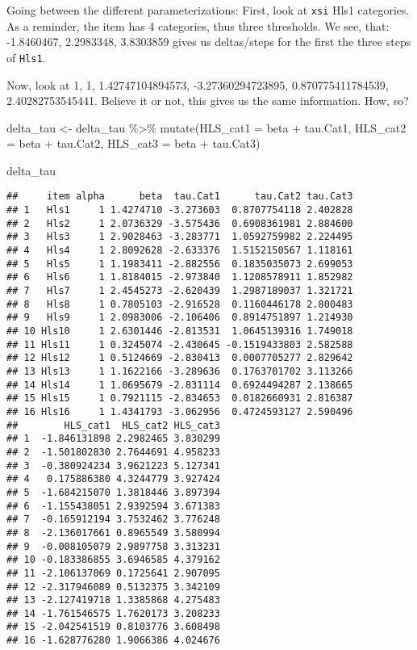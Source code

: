 \documentclass[
]{book}
\newenvironment{Shaded}{\begin{snugshade}}{\end{snugshade}}
\newcommand{\AttributeTok}[1]{\textcolor[rgb]{0.77,0.63,0.00}{#1}}
\newcommand{\FunctionTok}[1]{\textcolor[rgb]{0.00,0.00,0.00}{#1}}
\newcommand{\NormalTok}[1]{#1}
\newcommand{\OtherTok}[1]{\textcolor[rgb]{0.56,0.35,0.01}{#1}}
\newcommand{\SpecialCharTok}[1]{\textcolor[rgb]{0.00,0.00,0.00}{#1}}
\begin{document}
Going between the different parameterizations:
First, look at \texttt{xsi} Hls1 categories. As a reminder, the item has 4 categories, thus three thresholds. We see, that: -1.8460467, 2.2983348, 3.8303859 gives us deltas/steps for the first the three steps of \texttt{Hls1}.

Now, look at 1, 1, 1.42747104894573, -3.27360294723895, 0.870775411784539, 2.40282753545441. Believe it or not, this gives us the same information. How, so?

\begin{Shaded}
\begin{Highlighting}[]
\NormalTok{delta\_tau }\OtherTok{\textless{}{-}}\NormalTok{ delta\_tau }\SpecialCharTok{\%\textgreater{}\%}
  \FunctionTok{mutate}\NormalTok{(}\AttributeTok{HLS\_cat1 =}\NormalTok{ beta }\SpecialCharTok{+}\NormalTok{ tau.Cat1,}
         \AttributeTok{HLS\_cat2 =}\NormalTok{ beta }\SpecialCharTok{+}\NormalTok{ tau.Cat2,}
         \AttributeTok{HLS\_cat3 =}\NormalTok{ beta }\SpecialCharTok{+}\NormalTok{ tau.Cat3)}

\NormalTok{delta\_tau}
\end{Highlighting}
\end{Shaded}

\begin{verbatim}
##     item alpha      beta  tau.Cat1      tau.Cat2 tau.Cat3
## 1   Hls1     1 1.4274710 -3.273603  0.8707754118 2.402828
## 2   Hls2     1 2.0736329 -3.575436  0.6908361981 2.884600
## 3   Hls3     1 2.9028463 -3.283771  1.0592759982 2.224495
## 4   Hls4     1 2.8092628 -2.633376  1.5152150567 1.118161
## 5   Hls5     1 1.1983411 -2.882556  0.1835035073 2.699053
## 6   Hls6     1 1.8184015 -2.973840  1.1208578911 1.852982
## 7   Hls7     1 2.4545273 -2.620439  1.2987189037 1.321721
## 8   Hls8     1 0.7805103 -2.916528  0.1160446178 2.800483
## 9   Hls9     1 2.0983006 -2.106406  0.8914751897 1.214930
## 10 Hls10     1 2.6301446 -2.813531  1.0645139316 1.749018
## 11 Hls11     1 0.3245074 -2.430645 -0.1519433803 2.582588
## 12 Hls12     1 0.5124669 -2.830413  0.0007705277 2.829642
## 13 Hls13     1 1.1622166 -3.289636  0.1763701702 3.113266
## 14 Hls14     1 1.0695679 -2.831114  0.6924494287 2.138665
## 15 Hls15     1 0.7921115 -2.834653  0.0182660931 2.816387
## 16 Hls16     1 1.4341793 -3.062956  0.4724593127 2.590496
##        HLS_cat1  HLS_cat2 HLS_cat3
## 1  -1.846131898 2.2982465 3.830299
## 2  -1.501802830 2.7644691 4.958233
## 3  -0.380924234 3.9621223 5.127341
## 4   0.175886380 4.3244779 3.927424
## 5  -1.684215070 1.3818446 3.897394
## 6  -1.155438051 2.9392594 3.671383
## 7  -0.165912194 3.7532462 3.776248
## 8  -2.136017661 0.8965549 3.580994
## 9  -0.008105079 2.9897758 3.313231
## 10 -0.183386855 3.6946585 4.379162
## 11 -2.106137069 0.1725641 2.907095
## 12 -2.317946089 0.5132375 3.342109
## 13 -2.127419718 1.3385868 4.275483
## 14 -1.761546575 1.7620173 3.208233
## 15 -2.042541519 0.8103776 3.608498
## 16 -1.628776280 1.9066386 4.024676
\end{verbatim}
\end{document}
